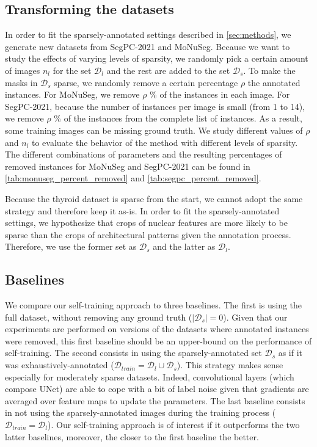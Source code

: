 \subsection{Transforming the datasets}

In order to fit the sparsely-annotated settings described in \cref{sec:methods}, we generate new datasets from SegPC-2021 and MoNuSeg. Because we want to study the effects of varying levels of sparsity, we randomly pick a certain amount of images $n_l$ for the set $\mathcal{D}_l$ and the rest are added to the set $\mathcal{D}_s$. To make the masks in $\mathcal{D}_s$ sparse, we randomly remove a certain percentage $\rho$ the annotated instances. For MoNuSeg, we remove $\rho$ \% of the instances in each image. For SegPC-2021, because the number of instances per image is small (from 1 to 14), we remove $\rho$ \% of the instances from the complete list of instances. As a result, some training images can be missing ground truth. We study different values of $\rho$ and $n_l$ to evaluate the behavior of the method with different levels of sparsity. The different combinations of parameters and the resulting percentages of removed instances for MoNuSeg and SegPC-2021 can be found in \cref{tab:monuseg_percent_removed} and \ref{tab:segpc_percent_removed}. 

Because the thyroid dataset is sparse from the start, we cannot adopt the same strategy and therefore keep it as-is. In order to fit the sparsely-annotated settings, we hypothesize that crops of nuclear features are more likely to be sparse than the crops of architectural patterns given the annotation process. Therefore, we use the former set as $\mathcal{D}_s$ and the latter as $\mathcal{D}_l$.



\subsection{Baselines}

We compare our self-training approach to three baselines. The first is using the full dataset, without removing any ground truth (\ie $|\mathcal{D}_s| = 0$). Given that our experiments are performed on versions of the datasets where annotated instances were removed, this first baseline should be an upper-bound on the performance of self-training. The second consists in using the sparsely-annotated set $\mathcal{D}_s$ as if it was exhaustively-annotated ($\mathcal{D}_{train} = \mathcal{D}_l \cup \mathcal{D}_s$). This strategy makes sense especially for moderately sparse datasets. Indeed, convolutional layers (which compose UNet) are able to cope with a bit of label noise given that gradients are averaged over feature maps to update the parameters. The last baseline consists in not using the sparsely-annotated images during the training process (\ie $\mathcal{D}_{train} = \mathcal{D}_l$). Our self-training approach is of interest if it outperforms the two latter baselines, moreover, the closer to the first baseline the better.

